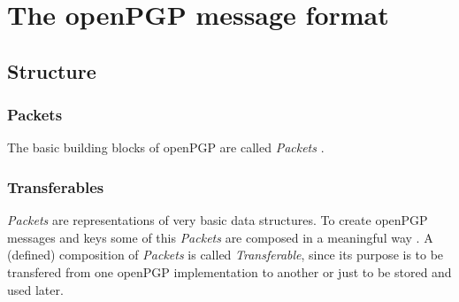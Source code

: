 \chapter{The openPGP message format} \label{chapter:messageformat}








\section{Structure}

\subsection{Packets}

The basic building blocks of openPGP are called \textit{Packets} \citep[section 4]{RFC4880}.


\subsection{Transferables}

\textit{Packets} are representations of very basic data structures. To create openPGP messages and keys some of this \textit{Packets} are composed in a meaningful way \citep[section 11]{RFC4880}. A (defined) composition of \textit{Packets} is called \textit{Transferable}, since its purpose is to be transfered from one openPGP implementation to another or just to be stored and used later. 

